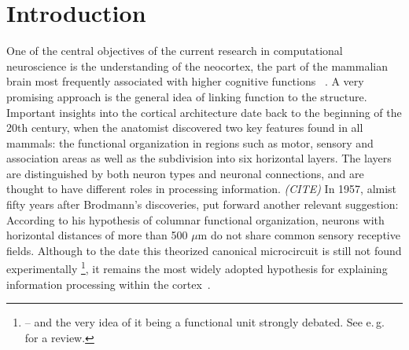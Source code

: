 \chapter{Introduction}
\label{sec:intro}

One of the central objectives of the current research in computational neuroscience
is the understanding of the neocortex, the part of the mammalian brain 
most frequently associated with higher cognitive functions%
~\cite{lui2011development}.
A very promising approach is the general idea of linking function to 
the structure. Important insights into the cortical architecture
date back to the beginning of the 20th century, when 
the anatomist  
discovered two key features found in all mammals:
the functional organization in regions such as motor, 
sensory and association areas as well as the subdivision into six horizontal 
layers. The layers are distinguished by both neuron types and neuronal connections, 
and are thought to have different roles in processing information. \emph{(CITE)}
In 1957, almist fifty years after Brodmann's discoveries, 
put forward another relevant suggestion:
According to his hypothesis of columnar functional organization, neurons with horizontal 
distances of more than 500 $\mu$m do not share common sensory receptive fields.
Although to the date this theorized canonical microcircuit is still not found experimentally%
\footnote{
-- and the very idea of it being a functional unit strongly debated. See e.\,g.~%
 for a review.
}, it remains the most widely adopted hypothesis for explaining information processing 
within the cortex~\cite{defelipe2012neocortical}.

